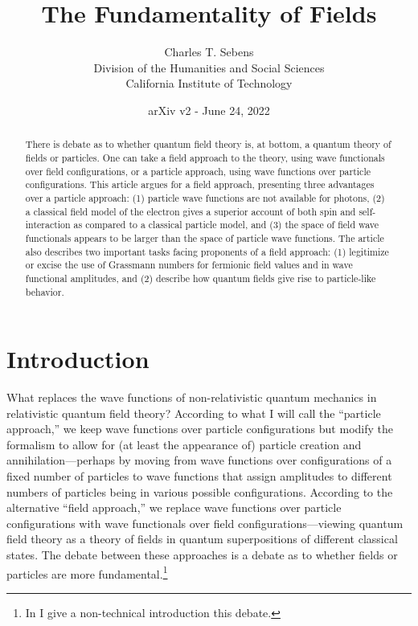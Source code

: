 \documentclass[12pt,onecolumn,secnumarabic,amsmath,amssymb,balancelastpage,nofootinbib]{article}
\begin{document}
\sloppy %




\title{{The Fundamentality of Fields}}
\author{Charles T. Sebens\\Division of the Humanities and Social Sciences\\ California Institute of Technology}
\date{arXiv v2 - June 24, 2022}

\maketitle
\thispagestyle{empty}

\begin{abstract}
There is debate as to whether quantum field theory is, at bottom, a quantum theory of fields or particles.  One can take a field approach to the theory, using wave functionals over field configurations, or a particle approach, using wave functions over particle configurations.  This article argues for a field approach, presenting three advantages over a particle approach: (1) particle wave functions are not available for photons, (2) a classical field model of the electron gives a superior account of both spin and self-interaction as compared to a classical particle model, and (3) the space of field wave functionals appears to be larger than the space of particle wave functions.  The article also describes two important tasks facing proponents of a field approach: (1) legitimize or excise the use of Grassmann numbers for fermionic field values and in wave functional amplitudes, and (2) describe how quantum fields give rise to particle-like behavior.
\end{abstract}

\newpage
\tableofcontents
\newpage


\section{Introduction}\label{introsec}


What replaces the wave functions of non-relativistic quantum mechanics in relativistic quantum field theory?  According to what I will call the ``particle approach,'' we keep wave functions over particle configurations but modify the formalism to allow for (at least the appearance of) particle creation and annihilation---perhaps by moving from wave functions over configurations of a fixed number of particles to wave functions that assign amplitudes to different numbers of particles being in various possible configurations.  According to the alternative ``field approach,'' we replace wave functions over particle configurations with wave functionals over field configurations---viewing quantum field theory as a theory of fields in quantum superpositions of different classical states.  The debate between these approaches is a debate as to whether fields or particles are more fundamental.\footnote{In \citet{sebensAeon} I give a non-technical introduction this debate.}
\end{document}
